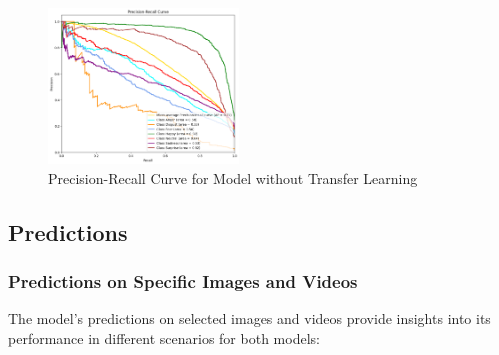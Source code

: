 \documentclass[conference]{IEEEtran}
\begin{document}
\begin{figure}[H]
    \centering
    \includegraphics[width=0.45\textwidth]{Figures/Precision-recall curve - no TL.png}
    \caption{Precision-Recall Curve for Model without Transfer Learning}
    \label{fig:prec_recall_no_tl}
\end{figure}

\subsection{Predictions}


\subsubsection{Predictions on Specific Images and Videos}
The model's predictions on selected images and videos provide insights into its performance in different scenarios for both models:
\end{document}
